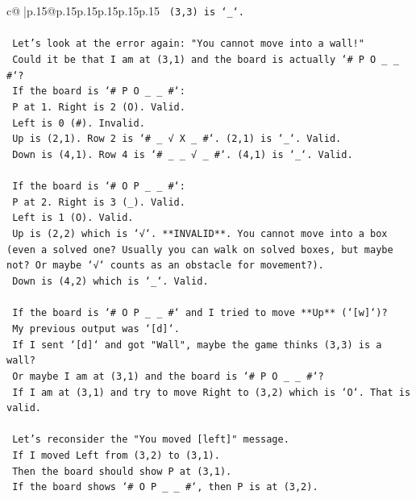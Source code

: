 \documentclass{article}
\begin{document}
{\begin{supertabular}{c@{$\;$}|p{.15\linewidth}@{}p{.15\linewidth}p{.15\linewidth}p{.15\linewidth}p{.15\linewidth}p{.15\linewidth}}
{{{\texttt{    (3,3) is `\_`.} \\
\\ 
\texttt{    Let's look at the error again: "You cannot move into a wall!"} \\
\texttt{    Could it be that I am at (3,1) and the board is actually `\# P O \_ \_ \#`?} \\
\texttt{    If the board is `\# P O \_ \_ \#`:} \\
\texttt{    P at 1. Right is 2 (O). Valid.} \\
\texttt{    Left is 0 (\#). Invalid.} \\
\texttt{    Up is (2,1). Row 2 is `\# \_ √ X \_ \#`. (2,1) is `\_`. Valid.} \\
\texttt{    Down is (4,1). Row 4 is `\# \_ \_ √ \_ \#`. (4,1) is `\_`. Valid.} \\
\\ 
\texttt{    If the board is `\# O P \_ \_ \#`:} \\
\texttt{    P at 2. Right is 3 (\_). Valid.} \\
\texttt{    Left is 1 (O). Valid.} \\
\texttt{    Up is (2,2) which is `√`. **INVALID**. You cannot move into a box (even a solved one? Usually you can walk on solved boxes, but maybe not? Or maybe `√` counts as an obstacle for movement?).} \\
\texttt{    Down is (4,2) which is `\_`. Valid.} \\
\\ 
\texttt{    If the board is `\# O P \_ \_ \#` and I tried to move **Up** (`{[}w{]}`)?} \\
\texttt{    My previous output was `{[}d{]}`.} \\
\texttt{    If I sent `{[}d{]}` and got "Wall", maybe the game thinks (3,3) is a wall?} \\
\texttt{    Or maybe I am at (3,1) and the board is `\# P O \_ \_ \#`?} \\
\texttt{    If I am at (3,1) and try to move Right to (3,2) which is `O`. That is valid.} \\
\\ 
\texttt{    Let's reconsider the "You moved {[}left{]}" message.} \\
\texttt{    If I moved Left from (3,2) to (3,1).} \\
\texttt{    Then the board should show P at (3,1).} \\
\texttt{    If the board shows `\# O P \_ \_ \#`, then P is at (3,2).} \\
}}}
\end{supertabular}}
\end{document}
